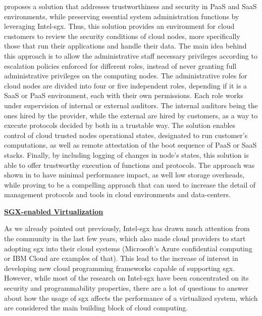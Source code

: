 \cite{sgxCloudThesis} proposes a solution that addresses trustworthiness and security in PaaS and SaaS environments, while preserving essential system administration functions by leveraging Intel-\gls{sgx}. Thus, this solution provides an environment for cloud customers to review the security conditions of cloud nodes, more specifically those that run their applications and handle their data.
The main idea behind this approach is to allow the administrative staff necessary privileges according to escalation policies enforced for different roles, instead of never granting full administrative privileges on the computing nodes.
The administrative roles for cloud nodes are divided into four or five independent roles, depending if it is a SaaS or PaaS environment, each with their own permissions. Each role works under supervision of internal or external auditors. The internal auditors being the ones hired by the provider, while the external are hired by customers, as a way to execute protocols decided by both in a trustable way. The solution enables control of cloud trusted nodes operational states, designated to run customer's computations, as well as remote attestation of the boot sequence of PaaS or SaaS stacks. Finally, by including logging of changes in node's states, this solution is able to offer trustworthy execution of functions and protocols.
The approach was shown in \cite{sgxCloudThesis} to have minimal performance impact, as well low storage overheads, while proving to be a compelling approach that can used to increase the detail of management protocols and tools in cloud environments and data-centers.\newline


\underline{\textbf{SGX-enabled Virtualization}}


As we already pointed out previously, Intel-\gls{sgx} has drawn much attention from the community in the last few years, which also made cloud providers to start adopting \gls{sgx} into their cloud systems (Microsoft's Azure confidential computing or IBM Cloud are examples of that). This lead to the increase of interest in developing new cloud programming frameworks capable of supporting \gls{sgx}.
However, while most of the research on Intel-\gls{sgx} have been concentrated on its security and programmability properties, there are a lot of questions to answer about how the usage of \gls{sgx} affects the performance of a virtualized system, which are considered the main building block of cloud computing.

